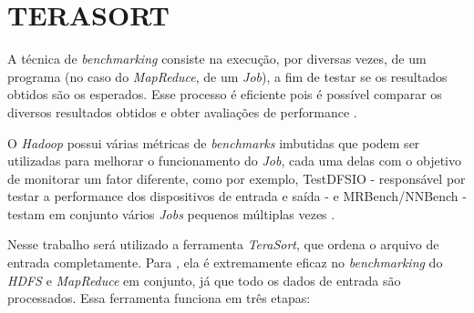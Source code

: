 \section{TERASORT} \label{sec:terasort}

A técnica de \textit{benchmarking} consiste na execução, por diversas vezes, de um programa (no caso do \textit{MapReduce}, de um \textit{Job}), a fim de testar se os resultados obtidos são os esperados. Esse processo é eficiente pois é possível comparar os diversos resultados obtidos e obter avaliações de performance \cite{HadoopBook15}.

O \textit{Hadoop} possui várias métricas de \textit{benchmarks} imbutidas que podem ser utilizadas para melhorar o funcionamento do \textit{Job}, cada uma delas com o objetivo de monitorar um fator diferente, como por exemplo, TestDFSIO  - responsável por testar a performance dos dispositivos de entrada e saída - e MRBench/NNBench - testam em conjunto vários \textit{Jobs} pequenos múltiplas vezes \cite{HadoopBook15}.

Nesse trabalho será utilizado a ferramenta \textit{TeraSort}, que ordena o arquivo de entrada completamente. Para \textcite{HadoopBook15}, ela é extremamente eficaz no \textit{benchmarking} do \textit{HDFS} e \textit{MapReduce} em conjunto, já que todo os dados de entrada são processados. Essa ferramenta funciona em três etapas:

